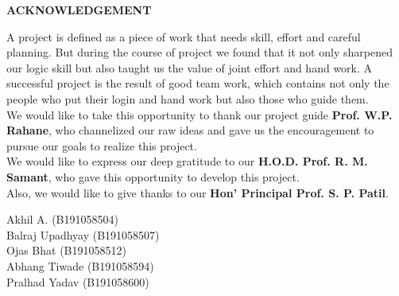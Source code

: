 \begin{center}
{\large{\bf{ACKNOWLEDGEMENT}}}
\end{center}


\noindent
A project is defined as a piece of work that needs skill, effort and careful planning. But during the course of project we found that it not only sharpened our logic skill but also taught us the value of joint effort and hand work. A successful project is the result of good team work, which contains not only the people who put their login and hand work but also those who guide them. \\
We would like to take this opportunity to thank our project guide \textbf{Prof. W.P. Rahane}, who channelized our raw ideas and gave us the encouragement to pursue our goals to realize this project. \\
We would like to express our deep gratitude to our \textbf{H.O.D. Prof. R. M. Samant}, who gave this opportunity to develop this project. \\
Also, we would like to give thanks to our \textbf{Hon’ Principal Prof. S. P. Patil}.

\begin{flushright}
Akhil A. (B191058504) \\
Balraj Upadhyay (B191058507) \\
Ojas Bhat (B191058512) \\
Abhang Tiwade (B191058594) \\
Pralhad Yadav (B191058600)

\end{flushright}



\clearpage